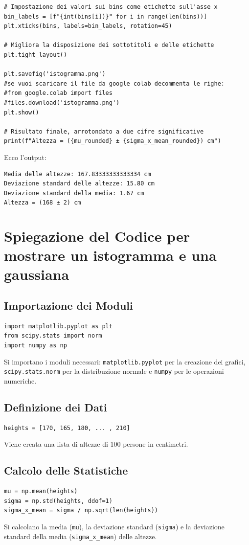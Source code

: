 \documentclass[a4paper,12pt]{article}
\begin{document}
\begin{lstlisting}[caption={Script Python per calcolare e visualizzare le altezze}]
# Impostazione dei valori sui bins come etichette sull'asse x
bin_labels = [f"{int(bins[i])}" for i in range(len(bins))]
plt.xticks(bins, labels=bin_labels, rotation=45)

# Migliora la disposizione dei sottotitoli e delle etichette
plt.tight_layout()

plt.savefig('istogramma.png')
#se vuoi scaricare il file da google colab decommenta le righe:
#from google.colab import files
#files.download('istogramma.png')
plt.show()

# Risultato finale, arrotondato a due cifre significative
print(f"Altezza = ({mu_rounded} ± {sigma_x_mean_rounded}) cm")
\end{lstlisting}


Ecco l'output:
\begin{verbatim}
Media delle altezze: 167.83333333333334 cm
Deviazione standard delle altezze: 15.80 cm
Deviazione standard della media: 1.67 cm
Altezza = (168 ± 2) cm
\end{verbatim}



\section{Spiegazione del Codice per mostrare un istogramma e una gaussiana}

\subsection{Importazione dei Moduli}
\begin{lstlisting}
import matplotlib.pyplot as plt
from scipy.stats import norm
import numpy as np
\end{lstlisting}
Si importano i moduli necessari: \texttt{matplotlib.pyplot} per la creazione dei grafici, \texttt{scipy.stats.norm} per la distribuzione normale e \texttt{numpy} per le operazioni numeriche.

\subsection{Definizione dei Dati}
\begin{lstlisting}
heights = [170, 165, 180, ... , 210]
\end{lstlisting}
Viene creata una lista di altezze di 100 persone in centimetri.

\subsection{Calcolo delle Statistiche}
\begin{lstlisting}
mu = np.mean(heights)
sigma = np.std(heights, ddof=1)
sigma_x_mean = sigma / np.sqrt(len(heights))
\end{lstlisting}
Si calcolano la media (\texttt{mu}), la deviazione standard (\texttt{sigma}) e la deviazione standard della media (\texttt{sigma\_x\_mean}) delle altezze.
\end{document}
